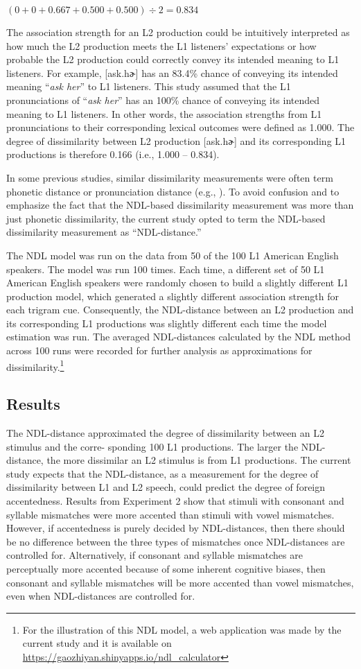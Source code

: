 $(0+0+0.667+0.500+0.500)\div 2 = 0.834 $

The association strength for an L2 production could be intuitively interpreted as how much the L2 production meets the L1 listeners' expectations or how probable the L2 production could correctly convey its intended meaning to L1 listeners.  For example, [ask.hɚ] has an 83.4\% chance of conveying its intended meaning “\textit{ask her}” to L1 listeners. This study assumed that the L1 pronunciations of “\textit{ask her}” has an 100\% chance of conveying its intended meaning to L1 listeners. In other words, the association strengths from L1 pronunciations to their corresponding lexical outcomes were defined as 1.000. The degree of dissimilarity between L2 production [ask.hɚ] and its corresponding L1 productions is therefore 0.166 (i.e., 1.000 – 0.834). 

 In some previous studies, similar dissimilarity measurements were often term phonetic distance or pronunciation distance (e.g., \citealp{Wieling_2014, Baayen_2016}). To avoid confusion and to emphasize the fact that the NDL-based dissimilarity measurement was more than just phonetic dissimilarity, the current study opted to term the NDL-based dissimilarity measurement as “NDL-distance.” 

The NDL model was run on the data from 50 of the 100 L1 American English speakers. The model was run 100 times. Each time, a different set of 50 L1 American English speakers were randomly chosen to build a slightly different L1 production model, which generated a slightly different association strength for each trigram cue. Consequently, the NDL-distance between an L2 production and its corresponding L1 productions was slightly different each time the model estimation was run. The averaged NDL-distances calculated by the NDL method across 100 runs were recorded for further analysis as approximations for dissimilarity.\footnote{For the illustration of this NDL model, a web application was made by the current study and it is available on \url{https://gaozhiyan.shinyapps.io/ndl_calculator}} 

\subsection{Results}

The NDL-distance approximated the degree of dissimilarity between an L2 stimulus and the corre- sponding 100 L1 productions. The larger the NDL-distance, the more dissimilar an L2 stimulus is from L1 productions. The current study expects that the NDL-distance, as a measurement for the degree of dissimilarity between L1 and L2 speech, could predict the degree of foreign accentedness. Results from Experiment 2 show that stimuli with consonant and syllable mismatches were more accented than stimuli with vowel mismatches. However, if accentedness is purely decided by NDL-distances, then there should be no difference between the three types of mismatches once NDL-distances are controlled for. Alternatively, if consonant and syllable mismatches are perceptually more accented because of some inherent cognitive biases, then consonant and syllable mismatches will be more accented than vowel mismatches, even when NDL-distances are controlled for.


